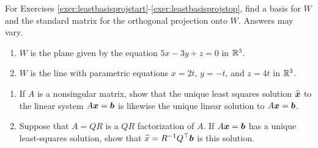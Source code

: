 \noindent For Exercises \ref{exer:leastbasisprojstart}-\ref{exer:leastbasisprojstop}, find a basis for $W$ and the standard matrix for the orthogonal projection onto $W$. Answers may vary.
\begin{enumerate}[!HW!, label=$\spadesuit$ \arabic*., ref=\arabic*]
\item\label{exer:leastbasisprojstart} $W$ is the plane given by the equation $5x-3y+z=0$ in $\mathbb{R}^3$. %
\item\label{exer:leastbasisprojstop} $W$ is the line with parametric equations $x=2t$, $y=-t$, and $z=4t$ in $\mathbb{R}^3$.\\ %
\end{enumerate}

\begin{enumerate}[!HW!]
\item If $A$ is a nonsingular matrix, show that the unique least squares solution $\widehat{\boldsymbol x}$ to the linear system $A\boldsymbol x = \boldsymbol b$ is likewise the unique linear solution to $A\boldsymbol x = \boldsymbol b$. %

\item Suppose that $A = QR$ is a $QR$ factorization of $A$. If $A\boldsymbol x = \boldsymbol b$ has a unique least-squares solution, show that $\widehat{x} = R^{-1}Q^\top \boldsymbol b$ is this solution. 
\end{enumerate}

 \mbox{}\vfill
 
\pagebreak
